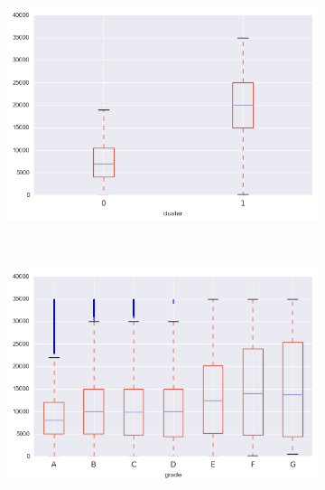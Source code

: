 \begin{apendicesenv}
\begin{figure}[t!]
\begin{subfigure}[t]{0.5\textwidth}
			\centerline{\includegraphics[width=1.05\textwidth]{img/total_rec_prncp_by_cluster}}
    	\end{subfigure}%
    	~ 
    	\begin{subfigure}[t]{0.5\textwidth}
    		\centering
   
			\centerline{\includegraphics[width=1.05\textwidth]{img/total_rec_prncp_by_grade}}

    	\end{subfigure}
\end{figure}



\begin{figure}[t!]
    \centering
        \caption{total\textunderscore rec\textunderscore late\textunderscore fee }
    	\begin{subfigure}[t]{0.5\textwidth}
    		\centering


\end{subfigure}
\end{figure}
\end{apendicesenv}
